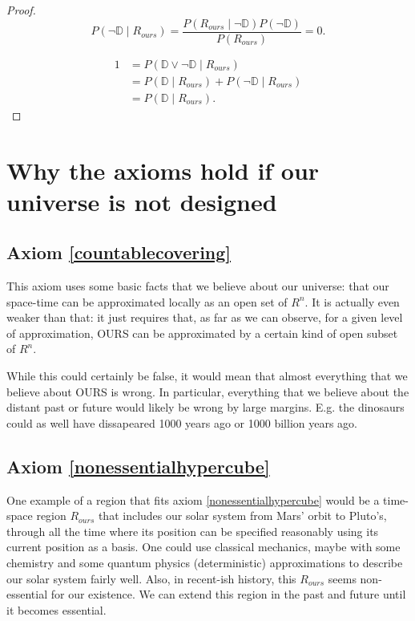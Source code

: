 \documentclass[a4paper
,draft
]{article}
\def\designer{\mathbb{D}}
\begin{document}
\begin{proof}
$$P(\lnot \designer \mid R_{ours}) = \frac{P(R_{ours} \mid \lnot \designer) P(\lnot \designer)}{P(R_{ours})} = 0.$$

\begin{equation*}
\begin{split}
1 &= P(\designer \lor \lnot \designer \mid R_{ours}) \\
  &= P(\designer \mid R_{ours}) + P(\lnot \designer \mid R_{ours}) \\
  &= P(\designer \mid R_{ours}).
\end{split}
\end{equation*}

\end{proof}

\section{Why the axioms hold if our universe is not designed}

\subsection{Axiom \ref{countablecovering}}

This axiom uses some basic facts that we believe about our universe: that our space-time can be approximated locally as an open set of $R^n$. It is actually even weaker than that: it just requires that, as far as we can observe, for a given level of approximation, OURS can be approximated by a certain kind of open subset of $R^n$.

While this could certainly be false, it would mean that almost everything that we believe about OURS is wrong. In particular, everything that we believe about the distant past or future would likely be wrong by large margins. E.g. the dinosaurs could as well have dissapeared 1000 years ago or 1000 billion years ago.

\subsection{Axiom \ref{nonessentialhypercube}}

One example of a region that fits axiom \ref{nonessentialhypercube} would be a time-space region $R_{ours}$ that includes our solar system from Mars' orbit to Pluto's, through all the time where its position can be specified reasonably using its current position as a basis. One could use classical mechanics, maybe with some chemistry and some quantum physics (deterministic) approximations to describe our solar system fairly well. Also, in recent-ish history, this $R_{ours}$ seems non-essential for our existence. We can extend this region in the past and future until it becomes essential.
\end{document}
